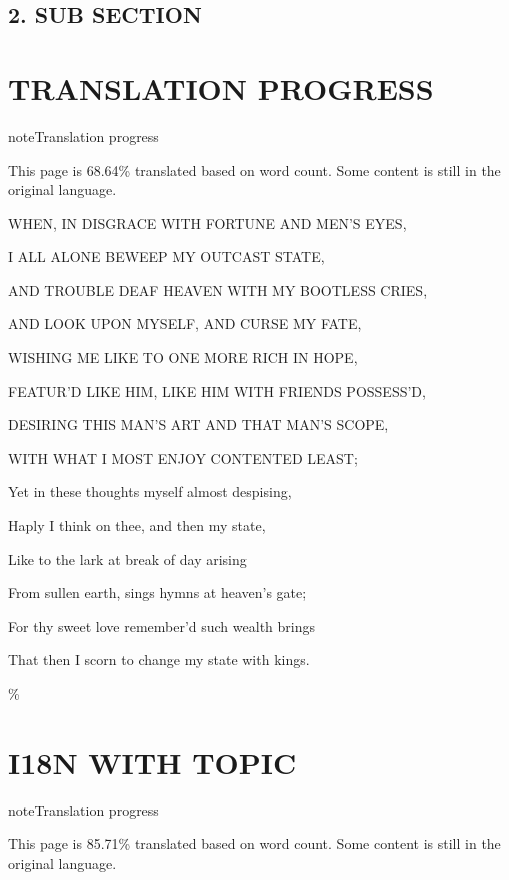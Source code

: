 \documentclass[letterpaper,10pt,english]{sphinxmanual}
\begin{document}
\section{2. SUB SECTION}
\label{\detokenize{section:sub-section}}
\sphinxstepscope


\chapter{TRANSLATION PROGRESS}
\label{\detokenize{translation_progress:translation-progress}}\label{\detokenize{translation_progress::doc}}
\begin{sphinxadmonition}{note}{Translation progress}

\sphinxAtStartPar
This page is 68.64\% translated based on word count. Some content is still in the original language.
\end{sphinxadmonition}

\sphinxAtStartPar
WHEN, IN DISGRACE WITH FORTUNE AND MEN’S EYES,

\sphinxAtStartPar
I ALL ALONE BEWEEP MY OUTCAST STATE,

\sphinxAtStartPar
AND TROUBLE DEAF HEAVEN WITH MY BOOTLESS CRIES,

\sphinxAtStartPar
AND LOOK UPON MYSELF, AND CURSE MY FATE,

\sphinxAtStartPar
WISHING ME LIKE TO ONE MORE RICH IN HOPE,

\sphinxAtStartPar
FEATUR’D LIKE HIM, LIKE HIM WITH FRIENDS POSSESS’D,

\sphinxAtStartPar
DESIRING THIS MAN’S ART AND THAT MAN’S SCOPE,

\sphinxAtStartPar
WITH WHAT I MOST ENJOY CONTENTED LEAST;

\sphinxAtStartPar
Yet in these thoughts myself almost despising,

\sphinxAtStartPar
Haply I think on thee, and then my state,

\sphinxAtStartPar
Like to the lark at break of day arising

\sphinxAtStartPar
From sullen earth, sings hymns at heaven’s gate;

\sphinxAtStartPar
For thy sweet love remember’d such wealth brings

\sphinxAtStartPar
That then I scorn to change my state with kings.

\%

\sphinxstepscope


\chapter{I18N WITH TOPIC}
\label{\detokenize{topic:i18n-with-topic}}\label{\detokenize{topic::doc}}
\begin{sphinxadmonition}{note}{Translation progress}

\sphinxAtStartPar
This page is 85.71\% translated based on word count. Some content is still in the original language.
\end{sphinxadmonition}
\end{document}
